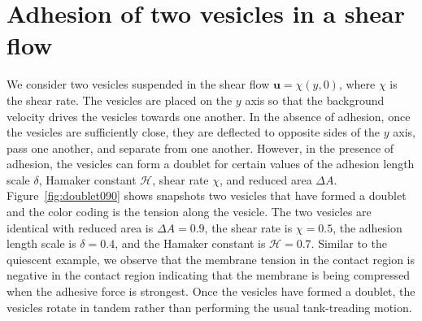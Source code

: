\documentclass[prf,superscriptaddress,showpacs]{revtex4-1}
\newcommand{\uu}{\mathbf{u}}
\begin{document}
\section{Adhesion of two vesicles in a shear flow}
\label{sec:sflow} 
We consider two vesicles suspended in the shear flow $\uu = \chi(y,0)$,
where $\chi$ is the shear rate.  The vesicles are placed on the $y$ axis
so that the background velocity drives the vesicles towards one another.
In the absence of adhesion, once the vesicles are sufficiently close,
they are deflected to opposite sides of the $y$ axis, pass one another,
and separate from one another.  However, in the presence of adhesion,
the vesicles can form a doublet for certain values of the adhesion
length scale $\delta$, Hamaker constant $\mathcal{H}$, shear rate
$\chi$, and reduced area $\Delta A$.  Figure~\ref{fig:doublet090} shows
snapshots two vesicles that have formed a doublet and the color coding
is the tension along the vesicle.  The two vesicles are
identical with reduced area is $\Delta A = 0.9$, the shear rate is $\chi
= 0.5$, the adhesion length scale is $\delta = 0.4$, and the Hamaker
constant is $\mathcal{H} = 0.7$.  Similar to the quiescent example, we
observe that the membrane tension in the contact region is negative in
the contact region indicating that the membrane is being compressed when
the adhesive force is strongest.  Once the vesicles have formed a
doublet, the vesicles rotate in tandem rather than performing the usual
tank-treading motion.
\end{document}
